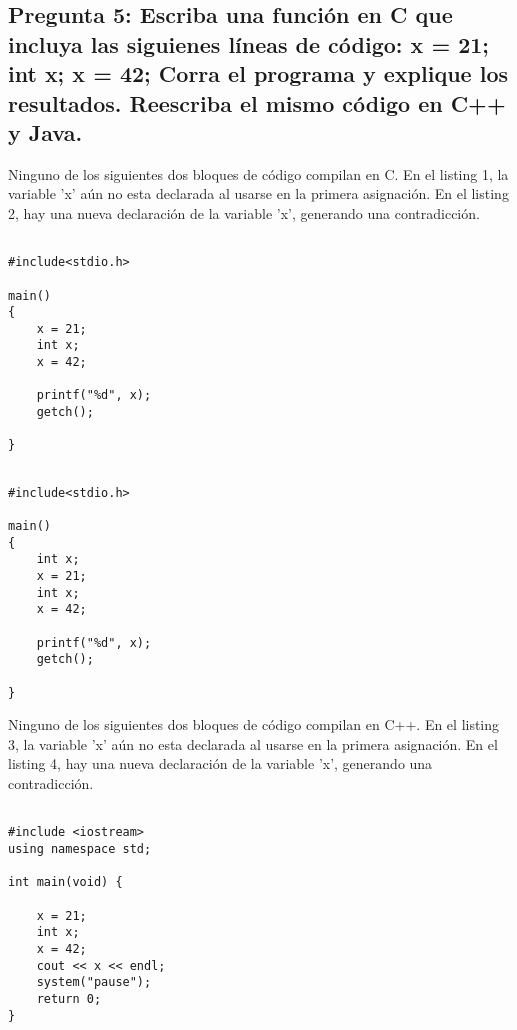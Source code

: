 \subsection{Pregunta 5: Escriba una función en C que incluya las siguienes líneas de código: \newline
x = 21; \newline
int x; \newline
x = 42; \newline
Corra el programa y explique los resultados. Reescriba el mismo código en C++ y Java.}

Ninguno de los siguientes dos bloques de código compilan en C. En el listing 1, la variable 'x' aún no esta declarada al usarse en la primera asignación.
En el listing 2, hay una nueva declaración de la variable 'x', generando una contradicción.

\lstset{language=C}          %

\begin{lstlisting}[caption= Pregunta 5 Capítulo 5, label=amb, frame=single]  % Start your code-block
  
#include<stdio.h>

main()
{
	x = 21;
	int x;
	x = 42;

	printf("%d", x);
	getch();

}
\end{lstlisting}
\begin{lstlisting}[caption= Pregunta 5 Capítulo 5, label=amb, frame=single]  % Start your code-block
  
#include<stdio.h>

main()
{
	int x;
	x = 21;
	int x;
	x = 42;

	printf("%d", x);
	getch();

}
\end{lstlisting}

Ninguno de los siguientes dos bloques de código compilan en C++. En el listing 3, la variable 'x' aún no esta declarada al usarse en la primera asignación.
En el listing 4, hay una nueva declaración de la variable 'x', generando una contradicción.

\lstset{language=C++}          %

\begin{lstlisting}[caption= Pregunta 5 Capítulo 5, label=amb, frame=single]  % Start your code-block
  
#include <iostream>
using namespace std;

int main(void) {
	
	x = 21;
	int x;
	x = 42;
	cout << x << endl;
	system("pause");
	return 0;
}
\end{lstlisting}


